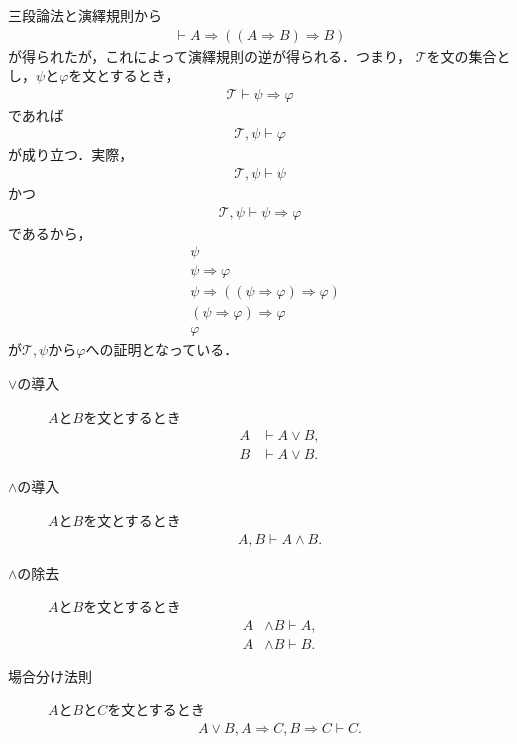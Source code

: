 	三段論法と演繹規則から
	\begin{align}
		\vdash A \Longrightarrow ((A \Longrightarrow B) \Longrightarrow B)
	\end{align}
	が得られたが，これによって演繹規則の逆が得られる．つまり，
	$\mathscr{T}$を文の集合とし，$\psi$と$\varphi$を文とするとき，
	\begin{align}
		\mathscr{T} \vdash \psi \Longrightarrow \varphi
	\end{align}
	であれば
	\begin{align}
		\mathscr{T},\psi \vdash \varphi
	\end{align}
	が成り立つ．実際，
	\begin{align}
		\mathscr{T},\psi \vdash \psi
	\end{align}
	かつ
	\begin{align}
		\mathscr{T},\psi \vdash \psi \Longrightarrow \varphi
	\end{align}
	であるから，
	\begin{align}
		&\psi \\
		&\psi \Longrightarrow \varphi \\
		&\psi \Longrightarrow ((\psi \Longrightarrow \varphi) \Longrightarrow \varphi) \\
		&(\psi \Longrightarrow \varphi) \Longrightarrow \varphi \\
		&\varphi
	\end{align}
	が$\mathscr{T},\psi$から$\varphi$への証明となっている．
	
	\begin{description}
		\item[$\vee$の導入] $A$と$B$を文とするとき
			\begin{align}
				A &\vdash A \vee B, \\
				B &\vdash A \vee B.
			\end{align}
		
		\item[$\wedge$の導入] $A$と$B$を文とするとき
			\begin{align}
				A,B \vdash A \wedge B.
			\end{align}
		
		\item[$\wedge$の除去] $A$と$B$を文とするとき
			\begin{align}
				A &\wedge B \vdash A, \\
				A &\wedge B \vdash B.
			\end{align}
			
		\item[場合分け法則] $A$と$B$と$C$を文とするとき
			\begin{align}
				A \vee B, A \Longrightarrow C, B \Longrightarrow C \vdash C.
			\end{align}
	\end{description}
	
